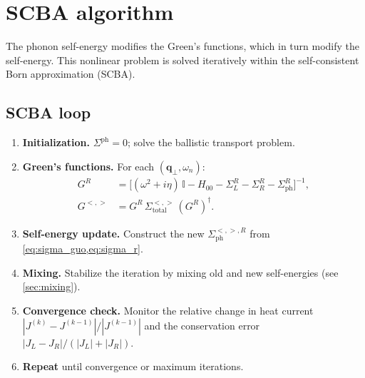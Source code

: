 \documentclass[11pt]{article}
\newcommand{\vc}[1]{\bm{#1}}
\newcommand{\vq}{\vc{q}}
\begin{document}
\section{SCBA algorithm}
\label{sec:scba}

The phonon self-energy modifies the Green's functions, which in turn
modify the self-energy.  This nonlinear problem is solved iteratively
within the self-consistent Born approximation (SCBA).

\subsection{SCBA loop}
\label{sec:scba_loop}

\begin{enumerate}
  \item \textbf{Initialization.}
        $\Sigma^\mathrm{ph} = 0$; solve the ballistic transport problem.

  \item \textbf{Green's functions.}
        For each $(\vq_\perp, \omega_n)$:
        \begin{align}
          G^R &= \bigl[(\omega^2+i\eta)\,\mathbb{I}
                 - H_{00} - \Sigma_L^R - \Sigma_R^R
                 - \Sigma_\mathrm{ph}^R\bigr]^{-1}, \\
          G^{<,>} &= G^R\,\Sigma^{<,>}_\mathrm{total}\,(G^R)^\dagger.
        \end{align}

  \item \textbf{Self-energy update.}
        Construct the new $\Sigma_\mathrm{ph}^{<,>,R}$ from
        \cref{eq:sigma_guo,eq:sigma_r}.

  \item \textbf{Mixing.}
        Stabilize the iteration by mixing old and new self-energies
        (see \cref{sec:mixing}).

  \item \textbf{Convergence check.}
        Monitor the relative change in heat current
        $|J^{(k)} - J^{(k-1)}| / |J^{(k-1)}|$ and the conservation
        error $|J_L - J_R| / (|J_L| + |J_R|)$.

  \item \textbf{Repeat} until convergence or maximum iterations.
\end{enumerate}
\end{document}
